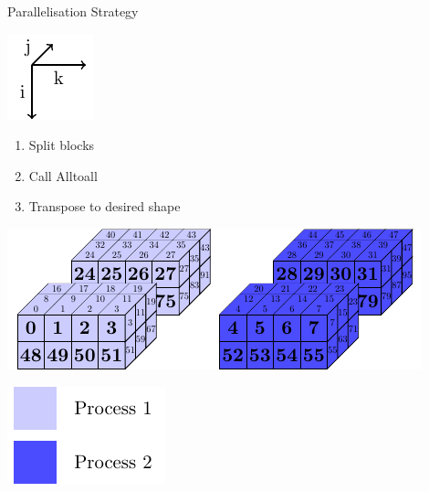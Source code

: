 \documentclass{beamer}
\begin{document}
\begin{frame}{Parallelisation Strategy}
 \begin{minipage}{.3\textwidth}
 \includegraphics[width=.4\textwidth]{SplitConcat3D/Axes}
 \vspace{4em}
 
  \begin{enumerate}
   \item Split blocks 
   \item Call Alltoall
   \item Transpose to desired shape
  \end{enumerate}
  
  \vspace{4em}
 \end{minipage}
 \begin{minipage}{.65\textwidth}
  \includegraphics[width=\textwidth]{SplitConcat3D/WrongRecv_2}
  
  \vspace{1em}
  
  \hfill\includegraphics[width=.3\textwidth]{SplitConcat3D/Legend}
 \end{minipage}
\end{frame}
\end{document}
